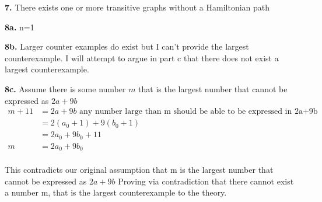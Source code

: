 \documentclass[12pt]{article}
\begin{document}
	\textbf{7.}
	There exists one or more transitive graphs without a Hamiltonian path
	
	\textbf{8a.} n=1
	
	\textbf{8b.} Larger counter examples do exist but I can't provide the largest counterexample. I will attempt to argue in part c that there does not exist a largest counterexample. 
	
	\textbf{8c.} Assume there is some number $ m $ that is the largest number that cannot be expressed as $ 2a + 9b $ 
	\begin{equation}
	\begin{split}
	m + 11 & = 2a + 9b \mbox{ any number large than m should be able to be expressed in 2a+9b terms }\\
	& =  2(a_{0} +1) + 9(b_{0}+1)\\
	& = 2a_{0} + 9b_{0} +11 \\
	m & = 2a_{0}+ 9b_{0} \\
	\end{split}
	\end{equation}
	
	This contradicts our original assumption that m is the largest number that cannot be expressed as $ 2a + 9b $ Proving via contradiction that there cannot exist a number m, that is the largest counterexample to the theory.
	
	
	
\end{document}

